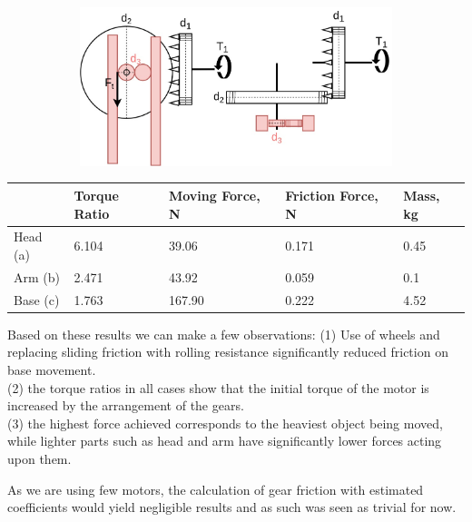 \documentclass{article}
\begin{document}
\begin{figure}[h]
\begin{subfigure}[b]{0.25\columnwidth}
\caption{}
\centering
\end{subfigure} 
\centering
\begin{subfigure}[b]{0.48\columnwidth}
\centerline{\includegraphics[width=\linewidth]{figs-demo2/ARMGEARS.jpg}}
\caption{}
\end{subfigure}
\end{figure}
\vspace{-3mm}

\begin{tabular}{|p{1.2cm}|p{1.1cm}|p{1.5cm}|p{1.5cm}|p{0.7cm}|}
\hline
            & Torque Ratio  & Moving Force, N & Friction Force, N & Mass, kg \\
\hline
Head (a)               & 6.104         & 39.06           & 0.171        & 0.45   \\
\hline
Arm (b)                & 2.471         & 43.92          & 0.059        & 0.1   \\
\hline
Base (c)               & 1.763         & 167.90         & 0.222        & 4.52 \\
\hline
\end{tabular}


Based on these results we can make a few observations:
(1) Use of wheels and replacing sliding friction with rolling resistance significantly reduced friction on base movement. \\
(2) the torque ratios in all cases show that the initial torque of the motor is increased by the arrangement of the gears. \\
(3) the highest force achieved corresponds to the heaviest object being moved, while lighter parts such as head and arm have significantly lower forces acting upon them. \vspace{0.5mm}

As we are using few motors, the calculation of gear friction with estimated coefficients would yield negligible results and as such was seen as trivial for now.
\end{document}
